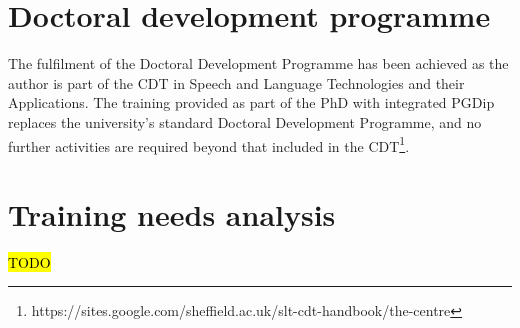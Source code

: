\documentclass[10pt,oneside]{book}
\begin{document}
\section{Doctoral development programme}

The fulfilment of the Doctoral Development Programme has been achieved as the author is part of the CDT in Speech and Language Technologies and their Applications. The training provided as part of the PhD with integrated PGDip replaces the university's standard Doctoral Development Programme, and no further activities are required beyond that included in the CDT\footnote{https://sites.google.com/sheffield.ac.uk/slt-cdt-handbook/the-centre}.

\section{Training needs analysis}

\hl{TODO}

\printbibliography[title={References}]

\appendix
\appendixpage 


\printglossary[type=\acronymtype]

% 

% 

% 

% 
\end{document}
